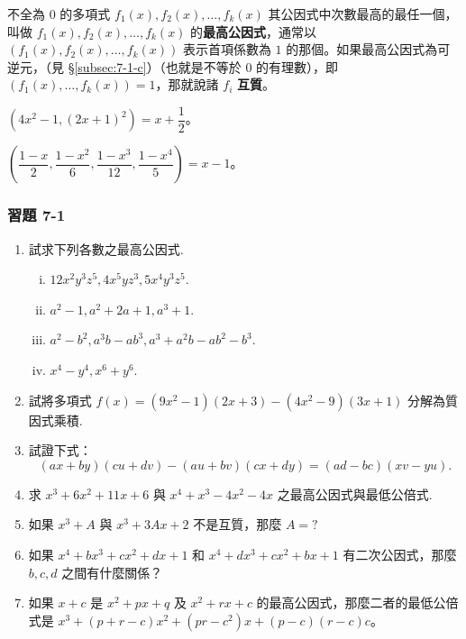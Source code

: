 \begin{definition*}
不全為 $0$ 的多項式 $f_1(x), f_2(x), \dots, f_k(x)$ 其公因式中次數最高的最任一個，叫做 $f_1(x), f_2(x), \dots, f_k(x)$ 的\textbf{最高公因式}，通常以 $(f_1(x), f_2(x), \dots, f_k(x))$ 表示首項係數為 $1$ 的那個。如果最高公因式為可逆元，（見 \S\ref{subsec:7-1-c}）（也就是不等於 $0$ 的有理數），即 $(f_1(x), \dots, f_k(x)) = 1$，那就說諸 $f_i$ \textbf{互質}。
\end{definition*}

\begin{example}\label{ex:7-1-1}
$(4x^2-1, (2x+1)^2) = x + \dfrac{1}{2}$。
\end{example}

\begin{example}\label{ex:7-1-2}
$\left(\dfrac{1-x}{2}, \dfrac{1-x^2}{6}, \dfrac{1-x^3}{12}, \dfrac{1-x^4}{5}\right) = x-1$。
\end{example}

\subsubsection*{習題 7-1}\label{sec:ex7-1}

\begin{enumerate}[1.]
  \item 試求下列各數之最高公因式.
  \begin{enumerate}[(i)]
    \item $12x^2 y^3 z^5, 4x^5 y z^3, 5x^4 y^3 z^5$.
    \item $a^2-1, a^2+2a+1, a^3+1$.
    \item $a^2-b^2, a^3 b-a b^3, a^3+a^2 b-a b^2-b^3$.
    \item $x^4-y^4, x^6+y^6$.
  \end{enumerate}

  \item 試將多項式 $f(x) = (9x^2-1)(2x+3) - (4x^2-9)(3x+1)$ 分解為質因式乘積.

  \item 試證下式：
  \begin{equation*}
    (ax+by)(cu+dv) - (au+bv)(cx+dy) = (ad-bc)(xv-yu).
  \end{equation*}

  \item 求 $x^3+6x^2+11x+6$ 與 $x^4+x^3-4x^2-4x$ 之最高公因式與最低公倍式.

  \item 如果 $x^3+A$ 與 $x^3+3Ax+2$ 不是互質，那麼 $A = ?$

  \item 如果 $x^4+bx^3+cx^2+dx+1$ 和 $x^4+dx^3+cx^2+bx+1$ 有二次公因式，那麼 $b, c, d$ 之間有什麼關係？

  \item 如果 $x+c$ 是 $x^2+px+q$ 及 $x^2+rx+c$ 的最高公因式，那麼二者的最低公倍式是 $x^3+(p+r-c)x^2+(pr-c^2)x+(p-c)(r-c)c$。
\end{enumerate}

